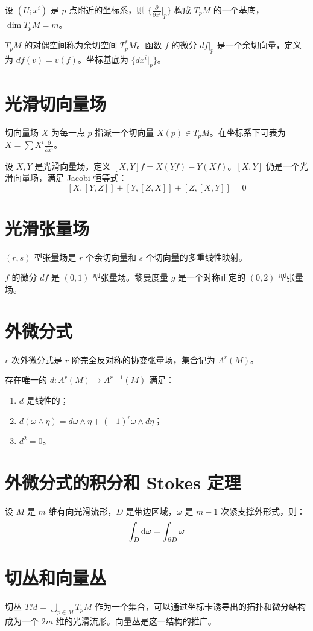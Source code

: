 \begin{theorem}
    设 $(U; x^i)$ 是 $p$ 点附近的坐标系，则 $\{ \frac{\partial}{\partial x^i}|_p \}$ 构成 $T_p M$ 的一个基底，$\dim T_p M = m$。
\end{theorem}

\begin{definition}[余切空间]
    $T_p M$ 的对偶空间称为余切空间 $T_p^* M$。函数 $f$ 的微分 $df|_p$ 是一个余切向量，定义为 $df(v) = v(f)$。坐标基底为 $\{ dx^i|_p \}$。
\end{definition}

\section{光滑切向量场}

切向量场 $X$ 为每一点 $p$ 指派一个切向量 $X(p) \in T_p M$。在坐标系下可表为 $X = \sum X^i \frac{\partial}{\partial x^i}$。
\begin{definition}[Poisson 括号]
    设 $X, Y$ 是光滑向量场，定义 $[X, Y]f = X(Yf) - Y(Xf)$。$[X, Y]$ 仍是一个光滑向量场，满足 Jacobi 恒等式：
    \[ [X, [Y, Z]] + [Y, [Z, X]] + [Z, [X, Y]] = 0 \]
\end{definition}

\section{光滑张量场}

$(r, s)$ 型张量场是 $r$ 个余切向量和 $s$ 个切向量的多重线性映射。
\begin{example}
    $f$ 的微分 $df$ 是 $(0, 1)$ 型张量场。黎曼度量 $g$ 是一个对称正定的 $(0, 2)$ 型张量场。
\end{example}

\section{外微分式}

$r$ 次外微分式是 $r$ 阶完全反对称的协变张量场，集合记为 $A^r(M)$。
\begin{theorem}[外微分算子]
    存在唯一的 $d: A^r(M) \to A^{r+1}(M)$ 满足：
    \begin{enumerate}[(1)]
        \item $d$ 是线性的；
        \item $d(\omega \wedge \eta) = d\omega \wedge \eta + (-1)^r \omega \wedge d\eta$；
        \item $d^2 = 0$。
    \end{enumerate}
\end{theorem}

\section{外微分式的积分和 Stokes 定理}

\begin{theorem}[Stokes 定理]
    设 $M$ 是 $m$ 维有向光滑流形，$D$ 是带边区域，$\omega$ 是 $m-1$ 次紧支撑外形式，则：
    \[ \int_D \mathrm{d}\omega = \int_{\partial D} \omega \]
\end{theorem}

\section{切丛和向量丛}

切丛 $TM = \bigcup_{p \in M} T_p M$ 作为一个集合，可以通过坐标卡诱导出的拓扑和微分结构成为一个 $2m$ 维的光滑流形。向量丛是这一结构的推广。
